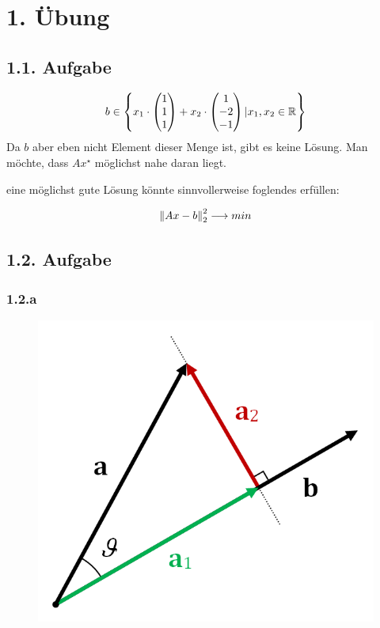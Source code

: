 \section*{1. Übung}
\subsection*{1.1. Aufgabe}
\begin{equation}
\begin{split}
	b \in \left\{ x_1 \cdot \begin{pmatrix*} 1\\ 1\\ 1 \end{pmatrix*} + x_2 \cdot \begin{pmatrix*} 1\\ -2\\ -1 \end{pmatrix*} | x_1, x_2 \in \R \right\}
\end{split}
\end{equation}
Da $b$ aber eben nicht Element dieser Menge ist, gibt es keine Lösung.
Man möchte, dass $Ax^\star$ möglichst nahe daran liegt.


eine möglichst \glqq gute\grqq{} Lösung könnte sinnvollerweise foglendes erfüllen:

\[
\left\lVert Ax-b\right\rVert^2_2 \longrightarrow min
\]

\subsection*{1.2. Aufgabe}
\subsubsection*{1.2.a}
\begin{figure}[ht]
	\centering
	\includegraphics[scale=.3]{Projection_and_rejection.png}
\end{figure}

